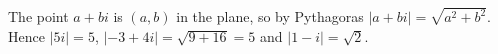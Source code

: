 The point $a+bi$ is $(a,b)$ in the plane, so by Pythagoras $|a+bi|=\sqrt{a^2+b^2}$. Hence $|5i|=\boxed{5}$, $|-3+4i|=\sqrt{9+16}=\boxed{5}$ and $|1-i|=\boxed{\sqrt2}$.
